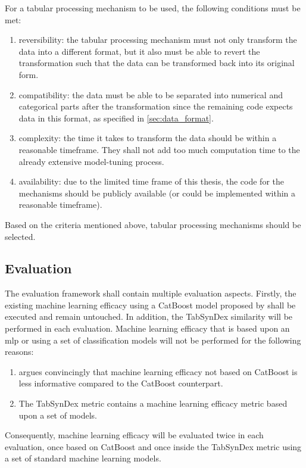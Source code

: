 For a tabular processing mechanism to be used, the following conditions must be met:

\begin{enumerate}
    \item reversibility: the tabular processing mechanism must not only transform the data into a different format, but it also must be able to revert the transformation
    such that the data can be transformed back into its original form.
    \item compatibility: the data must be able to be separated into numerical and categorical parts after the transformation
    since the remaining code expects data in this format, as specified in \autoref{sec:data_format}.
    \item complexity: the time it takes to transform the data should be within a reasonable timeframe. They shall not add too much computation time to the already extensive model-tuning process.
    \item availability: due to the limited time frame of this thesis, the code for the mechanisms should be publicly available (or could be implemented within a reasonable timeframe).
\end{enumerate}

Based on the criteria mentioned above, tabular processing mechanisms should be selected.


\subsection[]{Evaluation}
\label{ch:conceptualDesign-Evaluation}
The evaluation framework shall contain multiple evaluation aspects.
Firstly, the existing machine learning efficacy using a CatBoost model proposed by \cite{kotelnikov2022TabDDPMModellingTabular} shall be executed and remain untouched.
In addition, the TabSynDex \cite{chundawat2022UniversalMetricRobust} similarity will be performed in each evaluation.
Machine learning efficacy that is based upon an \gls{mlp} or using a set of classification models will not be performed for the following reasons:
\begin{enumerate}
    \item \cite{kotelnikov2022TabDDPMModellingTabular} argues convincingly that machine learning efficacy not based on CatBoost is less informative compared to the CatBoost counterpart.
    \item The TabSynDex metric contains a machine learning efficacy metric based upon a set of models.
\end{enumerate}
Consequently, machine learning efficacy will be evaluated twice in each evaluation, once based on CatBoost and once inside the TabSynDex metric using a set of standard machine learning models.

